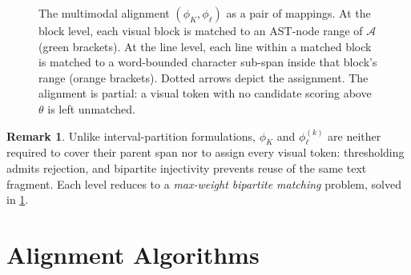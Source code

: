 \documentclass{article}
\theoremstyle{definition}
\newtheorem{remark}{Remark}[section]
\begin{document}
\begin{figure}[h]
      \caption{The multimodal alignment $(\phi_K, \phi_\ell)$ as a pair of
            mappings.  At the \textcolor{green!60!black}{block level}, each visual
            block is matched to an AST-node range of $\mathcal{A}$
            (green brackets).  At the \textcolor{orange!80!black}{line level},
            each line within a matched block is matched to a word-bounded
            character sub-span inside that block's range (orange brackets).
            Dotted arrows depict the assignment.  The alignment is partial: a
            visual token with no candidate scoring above $\theta$ is left unmatched.}
      \label{fig:alignment}
\end{figure}

\begin{remark}
      Unlike interval-partition formulations, $\phi_K$ and $\phi_\ell^{(k)}$
      are neither required to cover their parent span nor to assign every
      visual token: thresholding admits rejection, and bipartite injectivity
      prevents reuse of the same text fragment.  Each level reduces to a
      \emph{max-weight bipartite matching} problem, solved in \cref{sec:algo}.
\end{remark}

\section{Alignment Algorithms}
\label{sec:algo}
\end{document}
